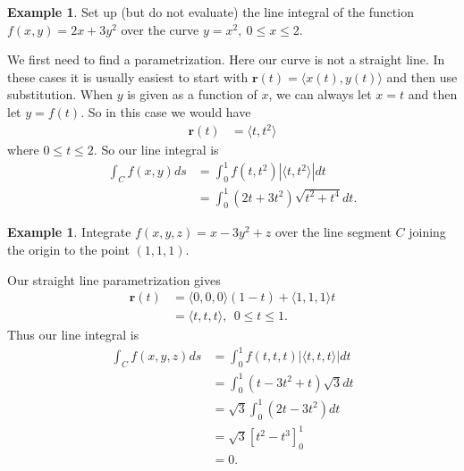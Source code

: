 \documentclass[12pt, letter]{article}
\theoremstyle{plain}
\numberwithin{theorem}{section}
\theoremstyle{definition}
\newtheorem{example}[theorem]{Example}
\begin{document}
\bigskip

\hrulefill

\bigskip

\begin{example}
Set up (but do not evaluate) the line integral of the function $f(x,y) = 2x+3y^2$ over the curve $y=x^2, \ 0\leq x \leq 2$.

\smallskip

We first need to find a parametrization. Here our curve is not a straight line. In these cases it is usually easiest to start with $\bm{r}(t) = \langle x(t),y(t)\rangle$ and then use substitution. When $y$ is given as a function of $x$, we can always let $x=t$ and then let $y=f(t)$. So in this case we would have
\begin{align*}
\bm{r}(t) &= \langle t, t^2 \rangle
\end{align*}
where $0\leq t \leq 2$. So our line integral is
\begin{align*}
\int_C f(x,y) ds&= \int_0^1 f(t,t^2) |\langle t, t^2 \rangle| dt\\
&= \int_0^1 (2t+3t^2)\sqrt{t^2+t^4} dt.
\end{align*}
\end{example}

\bigskip

\hrulefill

\bigskip

\begin{example}
Integrate $f(x,y,z) = x-3y^2+z$ over the line segment $C$ joining the origin to the point $(1,1,1)$.

\bigskip

Our straight line parametrization gives
\begin{align*}
\bm{r}(t) &= \langle 0,0,0 \rangle (1-t) + \langle 1,1,1 \rangle t\\
&= \langle t,t,t \rangle, \ \ 0\leq t \leq 1.
\end{align*}
Thus our line integral is
\begin{align*}
\int_C f(x,y,z)ds &= \int_0^1 f(t,t,t) |\langle t,t,t \rangle| dt\\
&= \int_0^1 (t-3t^2+t) \sqrt{3}dt\\
&= \sqrt{3} \int_0^1 (2t-3t^2) dt\\
&= \sqrt{3} \left[ t^2-t^3 \right]_0^1\\
&=0.
\end{align*}
\end{example}

\bigskip
\end{document}
